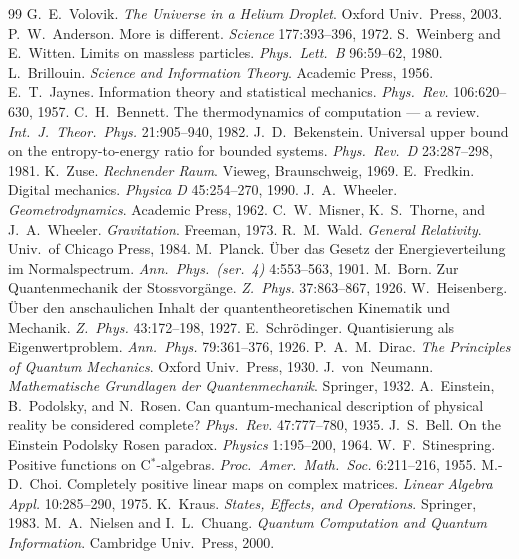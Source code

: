 \documentclass[10pt,twocolumn]{article}
\theoremstyle{definition}
\begin{document}
\begin{thebibliography}{99}
 G.~E.~Volovik. \emph{The Universe in a Helium Droplet}. Oxford Univ.\ Press, 2003.
 P.~W.~Anderson. More is different. \emph{Science} 177:393--396, 1972.
 S.~Weinberg and E.~Witten. Limits on massless particles. \emph{Phys.\ Lett.\ B} 96:59--62, 1980.
 L.~Brillouin. \emph{Science and Information Theory}. Academic Press, 1956.
 E.~T.~Jaynes. Information theory and statistical mechanics. \emph{Phys.\ Rev.} 106:620--630, 1957.
 C.~H.~Bennett. The thermodynamics of computation --- a review. \emph{Int.\ J.\ Theor.\ Phys.} 21:905--940, 1982.
 J.~D.~Bekenstein. Universal upper bound on the entropy-to-energy ratio for bounded systems. \emph{Phys.\ Rev.\ D} 23:287--298, 1981.
 K.~Zuse. \emph{Rechnender Raum}. Vieweg, Braunschweig, 1969.
 E.~Fredkin. Digital mechanics. \emph{Physica D} 45:254--270, 1990.
 J.~A.~Wheeler. \emph{Geometrodynamics}. Academic Press, 1962.
 C.~W.~Misner, K.~S.~Thorne, and J.~A.~Wheeler. \emph{Gravitation}. Freeman, 1973.
 R.~M.~Wald. \emph{General Relativity}. Univ.\ of Chicago Press, 1984.
 M.~Planck. \"Uber das Gesetz der Energieverteilung im Normalspectrum. \emph{Ann.\ Phys.\ (ser.~4)} 4:553--563, 1901.
 M.~Born. Zur Quantenmechanik der Stossvorg\"ange. \emph{Z.\ Phys.} 37:863--867, 1926.
 W.~Heisenberg. \"Uber den anschaulichen Inhalt der quantentheoretischen Kinematik und Mechanik. \emph{Z.\ Phys.} 43:172--198, 1927.
 E.~Schr\"odinger. Quantisierung als Eigenwertproblem. \emph{Ann.\ Phys.} 79:361--376, 1926.
 P.~A.~M.~Dirac. \emph{The Principles of Quantum Mechanics}. Oxford Univ.\ Press, 1930.
 J.~von~Neumann. \emph{Mathematische Grundlagen der Quantenmechanik}. Springer, 1932.
 A.~Einstein, B.~Podolsky, and N.~Rosen. Can quantum-mechanical description of physical reality be considered complete? \emph{Phys.\ Rev.} 47:777--780, 1935.
 J.~S.~Bell. On the Einstein Podolsky Rosen paradox. \emph{Physics} 1:195--200, 1964.
 W.~F.~Stinespring. Positive functions on C$^*$-algebras. \emph{Proc.\ Amer.\ Math.\ Soc.} 6:211--216, 1955.
 M.-D.~Choi. Completely positive linear maps on complex matrices. \emph{Linear Algebra Appl.} 10:285--290, 1975.
 K.~Kraus. \emph{States, Effects, and Operations}. Springer, 1983.
 M.~A.~Nielsen and I.~L.~Chuang. \emph{Quantum Computation and Quantum Information}. Cambridge Univ.\ Press, 2000.

\end{thebibliography}
\end{document}
